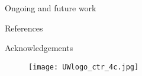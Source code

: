 \documentclass[final]{beamer}
\newlength{\onecolwid}
\begin{document}
\begin{frame}{}
\begin{columns}[t]
    \begin{column}{\onecolwid}\vspace{-2in}
      \begin{block}{Ongoing and future work}
        \vspace{12in}
      \end{block}
      \begin{block}{References}
      \end{block}
      \begin{block}{Acknowledgements}
      \end{block}
      \begin{figure}[!b]
        \texttt{[image: UWlogo\_ctr\_4c.jpg]}
      \end{figure}
    \end{column}
  \end{columns}
\end{frame}
\end{document}
